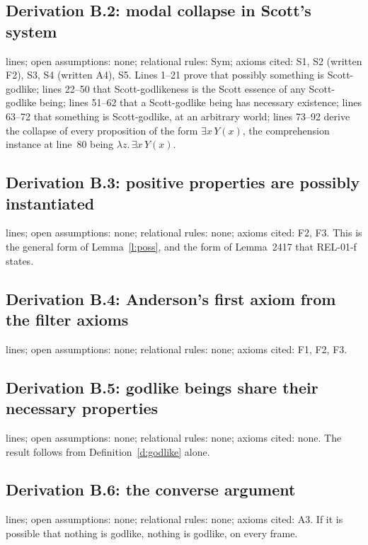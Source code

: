 \documentclass{situationist-preprint}
\begin{document}


\subsection{Derivation B.2: modal collapse in Scott's system}

\csLinesScott{} lines; open assumptions: none; relational rules: Sym; axioms cited: S1, S2 (written F2), S3, S4 (written A4), S5. Lines 1--21 prove that possibly something is Scott-godlike; lines 22--50 that Scott-godlikeness is the Scott essence of any Scott-godlike being; lines 51--62 that a Scott-godlike being has necessary existence; lines 63--72 that something is Scott-godlike, at an arbitrary world; lines 73--92 derive the collapse of every proposition of the form $\exists x\,Y(x)$, the comprehension instance at line~80 being $\lambda z.\,\exists x\,Y(x)$.



\subsection{Derivation B.3: positive properties are possibly instantiated}

\csLinesPositive{} lines; open assumptions: none; relational rules: none; axioms cited: F2, F3. This is the general form of Lemma~\ref{l:poss}, and the form of Lemma~2417 that REL-01-f states.



\subsection{Derivation B.4: Anderson's first axiom from the filter axioms}

\csLinesAnderson{} lines; open assumptions: none; relational rules: none; axioms cited: F1, F2, F3.



\subsection{Derivation B.5: godlike beings share their necessary properties}

\csLinesIndisc{} lines; open assumptions: none; relational rules: none; axioms cited: none. The result follows from Definition~\ref{d:godlike} alone.



\subsection{Derivation B.6: the converse argument}

\csLinesConverse{} lines; open assumptions: none; relational rules: none; axioms cited: A3. If it is possible that nothing is godlike, nothing is godlike, on every frame.


\end{document}
